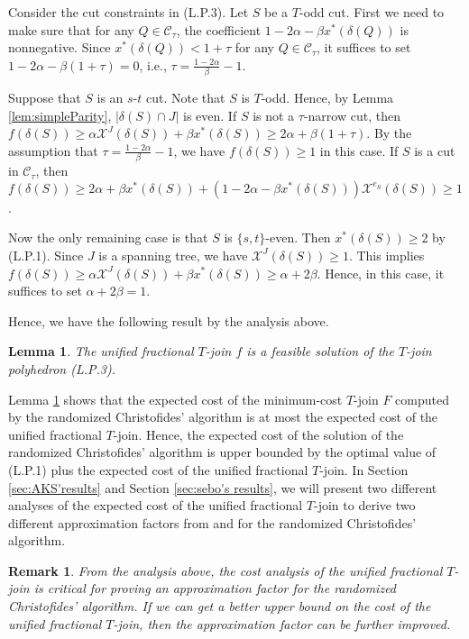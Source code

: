\documentclass[11pt]{article}
\newtheorem{lemma}[theorem]{Lemma}
\newtheorem{remark}[theorem]{Remark}
\begin{document}
Consider the cut constraints in (L.P.3). Let $S$ be a $T$-odd cut. First we need to make sure that for any
$Q\in \mathcal{C}_\tau$, the coefficient $1-2\alpha - \beta x^*(\delta(Q))$ is nonnegative. Since $x^*(\delta(Q))<1+\tau$ for any $Q\in \mathcal{C}_\tau$, it
suffices to set $1-2\alpha -\beta(1+\tau)=0$, i.e., $\tau=\frac{1-2\alpha}{\beta}-1$.


Suppose that $S$ is an $s$-$t$ cut.
Note that $S$ is $T$-odd.
Hence, by Lemma \ref{lem:simpleParity}, $|\delta(S)\cap J|$ is even.
If $S$ is not a $\tau$-narrow cut, then
$f(\delta(S))\geq \alpha \mathcal{X}^J (\delta(S))+ \beta x^*(\delta(S)) \geq
2\alpha +\beta(1+\tau)$. By the assumption that $\tau=\frac{1-2\alpha}{\beta}-1$, we have $f(\delta(S))\geq 1$ in this case.
If $S$ is a cut in $\mathcal{C}_\tau$, then $f(\delta(S))\geq 2\alpha +\beta x^*(\delta(S)) +
(1-2\alpha - \beta x^*(\delta(S)))\mathcal{X}^{e_{S}}(\delta(S))\geq 1 $.

Now the only remaining case is that $S$ is $\{s, t\}$-even. Then $x^*(\delta(S))\geq 2$ by (L.P.1).
Since $J$ is a spanning tree, we have $\mathcal{X}^J(\delta(S))\geq 1$.
This implies $f(\delta(S))\geq
\alpha \mathcal{X}^J (\delta(S))+ \beta x^*(\delta(S)) \geq \alpha+ 2\beta$. Hence, in this case,
it suffices to set $\alpha+ 2\beta=1$.

Hence, we have the following result by the analysis above.

\begin{lemma}\label{lem:feasible}
The unified fractional $T$-join $f$ is
a feasible solution of the $T$-join polyhedron (L.P.3).
\end{lemma}

Lemma \ref{lem:feasible} shows that the expected cost of the minimum-cost $T$-join $F$ computed by
the randomized Christofides' algorithm is
at most the expected cost of the unified fractional $T$-join. Hence, the expected cost of the solution of the randomized
Christofides' algorithm is upper bounded by the optimal value of (L.P.1) plus the expected cost of the
unified fractional $T$-join.  In Section \ref{sec:AKS'results} and Section \ref{sec:sebo's results}, we will present two different analyses of the
expected cost of the unified fractional $T$-join to derive two different approximation factors from \cite{AKS12} and \cite{sebo13} for the randomized
Christofides' algorithm.


\begin{remark}
From the analysis above,  the cost analysis of the
unified fractional $T$-join is critical for proving
an approximation factor for the randomized Christofides' algorithm.
If we can get a better upper bound on the cost of the unified fractional $T$-join,
then the approximation factor can be further improved.
\end{remark}
\end{document}
